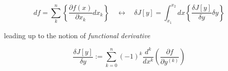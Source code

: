 \begin{equation*}
  df = \sum_{k}^{n} \left\{ \frac{\partial f(x)}{\partial x_k} dx_k \right\}
  \quad \longleftrightarrow \quad
  \delta J[y] = \int_{x_1}^{x_2} dx
  \left\{ \frac{\delta J[y]}{\delta y} \delta y \right\}
\end{equation*}

leading up to the notion of \emph{functional derivative}

\begin{equation} \label{eq:functional_derivative}
  \frac{\delta J[y]}{\delta y} := \sum_{k = 0}^{n} (-1)^k \frac{d^k}{dx^k}
  \left( \frac{\partial f}{\partial y^{(k)}}\right)
\end{equation}
